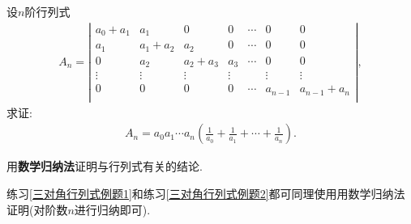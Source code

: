 \documentclass[lang=cn,newtx,10pt,scheme=chinese]{elegantbook}
\begin{document}
\begin{exercise}\label{使用数学归纳法计算行列式例题1}
设$n$阶行列式
\begin{align}
A_n=\left| \begin{matrix}
a_0+a_1&		a_1&		0&		0&		\cdots&		0&		0\\
a_1&		a_1+a_2&		a_2&		0&		\cdots&		0&		0\\
0&		a_2&		a_2+a_3&		a_3&		\cdots&		0&		0\\
\vdots&		\vdots&		\vdots&		\vdots&		&		\vdots&		\vdots\\
0&		0&		0&		0&		\cdots&		a_{n-1}&		a_{n-1}+a_n\\
\end{matrix} \right|,
\nonumber
\end{align}
求证:
\begin{align}
A_n=a_0a_1\cdots a_n\left( \frac{1}{a_0}+\frac{1}{a_1}+\cdots +\frac{1}{a_n} \right) .
\nonumber
\end{align}
\end{exercise}
\begin{note}
用\hypertarget{用数学归纳法与行列式有关的结论}{\textbf{数学归纳法}}证明与行列式有关的结论.

练习\ref{三对角行列式例题1}和练习\ref{三对角行列式例题2}都可同理使用用数学归纳法证明(对阶数$n$进行归纳即可).
\end{note}
\end{document}
